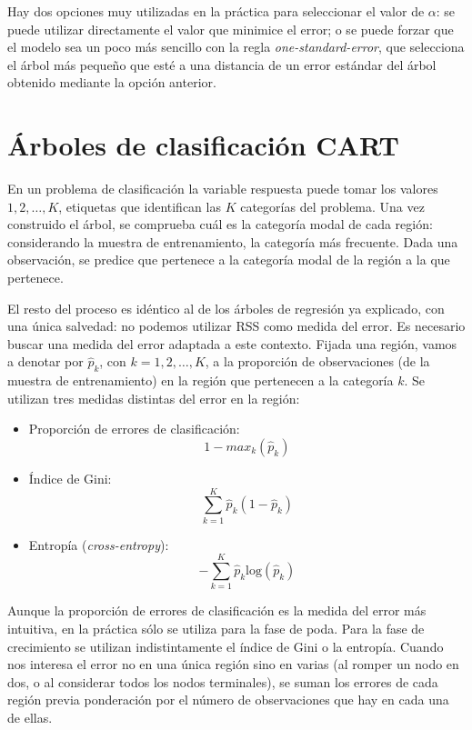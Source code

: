 \documentclass[]{book}
\theoremstyle{break}
\theoremstyle{definition}
\theoremstyle{definition}
\theoremstyle{definition}
\theoremstyle{remark}
\begin{document}
Hay dos opciones muy utilizadas en la práctica para seleccionar el valor
de \(\alpha\): se puede utilizar directamente el valor que minimice el
error; o se puede forzar que el modelo sea un poco más sencillo con la
regla \emph{one-standard-error}, que selecciona el árbol más pequeño que
esté a una distancia de un error estándar del árbol obtenido mediante la
opción anterior.

\section{Árboles de clasificación
CART}\label{uxe1rboles-de-clasificaciuxf3n-cart}

En un problema de clasificación la variable respuesta puede tomar los
valores \(1, 2, \ldots, K\), etiquetas que identifican las \(K\)
categorías del problema. Una vez construido el árbol, se comprueba cuál
es la categoría modal de cada región: considerando la muestra de
entrenamiento, la categoría más frecuente. Dada una observación, se
predice que pertenece a la categoría modal de la región a la que
pertenece.

El resto del proceso es idéntico al de los árboles de regresión ya
explicado, con una única salvedad: no podemos utilizar RSS como medida
del error. Es necesario buscar una medida del error adaptada a este
contexto. Fijada una región, vamos a denotar por \(\widehat p_{k}\), con
\(k = 1, 2, \ldots, K\), a la proporción de observaciones (de la muestra
de entrenamiento) en la región que pertenecen a la categoría \(k\). Se
utilizan tres medidas distintas del error en la región:

\begin{itemize}
\item
  Proporción de errores de clasificación:
  \[1 - max_{k} (\widehat p_{k})\]
\item
  Índice de Gini: \[\sum_{k=1}^K \widehat p_{k} (1 - \widehat p_{k})\]
\item
  Entropía (\emph{cross-entropy}):
  \[- \sum_{k=1}^K \widehat p_{k} \text{log}(\widehat p_{k})\]
\end{itemize}

Aunque la proporción de errores de clasificación es la medida del error
más intuitiva, en la práctica sólo se utiliza para la fase de poda. Para
la fase de crecimiento se utilizan indistintamente el índice de Gini o
la entropía. Cuando nos interesa el error no en una única región sino en
varias (al romper un nodo en dos, o al considerar todos los nodos
terminales), se suman los errores de cada región previa ponderación por
el número de observaciones que hay en cada una de ellas.
\end{document}
